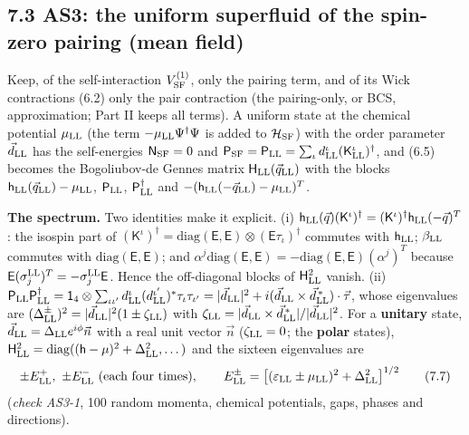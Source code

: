 \documentclass[
  10pt,
]{article}
\begin{document}
\hypertarget{as3-the-uniform-superfluid-of-the-spin-zero-pairing-mean-field}{%
\subsection{7.3 AS3: the uniform superfluid of the spin-zero pairing
(mean
field)}\label{as3-the-uniform-superfluid-of-the-spin-zero-pairing-mean-field}}

Keep, of the self-interaction \(V^{(1)}_{\rm SF}\), only the pairing
term, and of its Wick contractions (6.2) only the pair contraction (the
pairing-only, or BCS, approximation; Part II keeps all terms). A uniform
state at the chemical potential \(\mu_{\rm LL}\) (the term
\(-\mu_{\rm LL}\Psi^\dagger\Psi\) is added to \(\mathcal H_{\rm SF}\))
with the order parameter \(\vec d_{\rm LL}\) has the self-energies
\(\mathsf N_{\rm SF}=0\) and
\(\mathsf P_{\rm SF}=\mathsf P_{\rm LL}=\sum_\iota d^\iota_{\rm LL}(\mathsf K^\iota_{\rm LL})^\dagger\),
and (6.5) becomes the Bogoliubov-de Gennes matrix
\(\mathsf H_{\rm LL}(\vec q_{\rm LL})\) with the blocks
\(\mathsf h_{\rm LL}(\vec q_{\rm LL})-\mu_{\rm LL}\),
\(\mathsf P_{\rm LL}\), \(\mathsf P_{\rm LL}^\dagger\) and
\(-(\mathsf h_{\rm LL}(-\vec q_{\rm LL})-\mu_{\rm LL})^T\).

\textbf{The spectrum.} Two identities make it explicit. (i)
\(\mathsf h_{\rm LL}(\vec q)(\mathsf K^\iota)^\dagger=(\mathsf K^\iota)^\dagger\mathsf h_{\rm LL}(-\vec q)^T\):
the isospin part of
\((\mathsf K^\iota)^\dagger=\mathrm{diag}(\mathsf E,\mathsf E)\otimes(\mathsf E\tau_\iota)^\dagger\)
commutes with \(\mathsf h_{\rm LL}\); \(\beta_{\rm LL}\) commutes with
\(\mathrm{diag}(\mathsf E,\mathsf E)\); and
\(\alpha^j\mathrm{diag}(\mathsf E,\mathsf E)=-\mathrm{diag}(\mathsf E,\mathsf E)(\alpha^j)^T\)
because \(\mathsf E(\sigma^{\rm LL}_j)^T=-\sigma^{\rm LL}_j\mathsf E\).
Hence the off-diagonal blocks of \(\mathsf H_{\rm LL}^2\) vanish. (ii)
\(\mathsf P_{\rm LL}\mathsf P_{\rm LL}^\dagger=\mathsf 1_4\otimes\sum_{\iota\iota'}d^\iota_{\rm LL}(d^{\iota'}_{\rm LL})^*\tau_\iota\tau_{\iota'}=\lvert\vec d_{\rm LL}\rvert^2+i(\vec d_{\rm LL}\times\vec d^{\,*}_{\rm LL})\cdot\vec\tau\),
whose eigenvalues are
\((\Delta^\pm_{\rm LL})^2=\lvert\vec d_{\rm LL}\rvert^2(1\pm\zeta_{\rm LL})\)
with
\(\zeta_{\rm LL}=\lvert\vec d_{\rm LL}\times\vec d^{\,*}_{\rm LL}\rvert/\lvert\vec d_{\rm LL}\rvert^2\).
For a \textbf{unitary} state,
\(\vec d_{\rm LL}=\Delta_{\rm LL}e^{i\phi}\vec n\) with a real unit
vector \(\vec n\) (\(\zeta_{\rm LL}=0\); the \textbf{polar} states),
\(\mathsf H_{\rm LL}^2=\mathrm{diag}((\mathsf h-\mu)^2+\Delta^2_{\rm LL},\dots)\)
and the sixteen eigenvalues are
\[\pm E^+_{\rm LL},\ \pm E^-_{\rm LL}\ \text{(each four times)},\qquad E^\pm_{\rm LL}=\big[(\varepsilon_{\rm LL}\pm\mu_{\rm LL})^2+\Delta_{\rm LL}^2\big]^{1/2}\tag{7.7}\]
(\emph{check AS3-1}, 100 random momenta, chemical potentials, gaps,
phases and directions).
\end{document}
